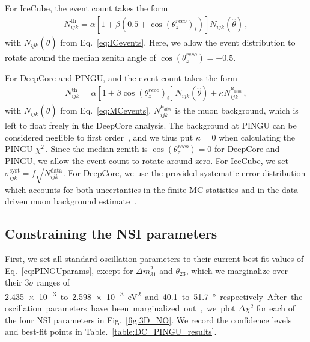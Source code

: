 \documentclass[draft=True]{revtex4-2}
\newcommand{\zreco}{\ensuremath{\cos{(\theta_z^{reco})}}}
\newcommand{\dm}{\Delta m^2_{31}}
\begin{document}
For IceCube, the event count takes the form
\begin{align}
    N^\text{th}_{ijk} = \alpha\left[1+\beta (0.5 + \zreco_i )\right] N_{ijk}(\hat{\theta})\,,
\end{align}
with $N_{ijk}(\hat{\theta})$ from Eq.~\ref{eq:ICevents}. Here, we allow the event distribution to rotate around the median zenith angle of $\zreco = -0.5$.

For DeepCore and PINGU, and the event count takes the form
\begin{align}
    N^\text{th}_{ijk} = \alpha\left[1+\beta \zreco_i \right] N_{ijk}(\hat{\theta}) + \kappa N_{ijk}^{\mu_{atm}}\,,
\end{align}
with $N_{ijk}(\hat{\theta})$ from Eq.~\ref{eq:MCevents}. $N_{ijk}^{\mu_{atm}}$ is the muon background, which is left to float freely in the DeepCore analysis.
The background at PINGU can be considered neglible to first order~\cite{PINGUdata}, and we thus put $\kappa=0$ when calculating the PINGU $\chi^2$\,. 
Since the median zenith is $\zreco = 0$ for DeepCore and PINGU, we allow the event count to rotate around zero.
For IceCube, we set $\sigma_{ijk}^\text{syst} = f\sqrt{N_{ijk}^\text{data}}$. %
For DeepCore, we use the provided systematic error distribution which accounts for both uncertanties in the finite MC statistics and in the data-driven 
muon background estimate~\cite{DC2019data}. %

\subsection{Constraining the NSI parameters}
First, we set all standard oscillation parameters to their current best-fit values of Eq.~\ref{eq:PINGUparams}, except for $\dm$ and $\theta_{23}$, 
which we marginalize over their $3\sigma$ ranges of \SI{2.435e-3} to \SI{2.598e-3}{\electronvolt^2} and \SI{40.1} to \SI{51.7}{\degree} respectively. %
After the oscillation parameters have been marginalized out, we plot $\Delta \chi^2$ for each of the four NSI parameters in Fig.~\ref{fig:3D_NO}. We record the 
confidence levels and best-fit points in Table.~\ref{table:DC_PINGU_results}.
\end{document}
